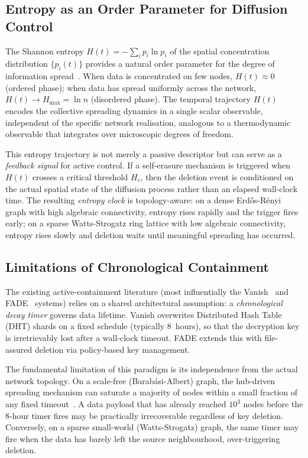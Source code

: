 \documentclass[review,12pt]{elsarticle}
\newcommand{\Hc}{H_c}
\newcommand{\Hmax}{H_{\max}}
\begin{document}
\subsection{Entropy as an Order Parameter for Diffusion Control}

The Shannon entropy $H(t) = -\sum_i p_i \ln p_i$ of the spatial concentration
distribution $\{p_i(t)\}$ provides a natural order parameter for the degree of
information spread~\cite{zhao2024multi}.  When data is concentrated on few nodes,
$H(t) \approx 0$ (ordered phase); when data has spread uniformly across the
network, $H(t) \to \Hmax = \ln n$ (disordered phase).  The temporal trajectory
$H(t)$ encodes the collective spreading dynamics in a single scalar observable,
independent of the specific network realisation, analogous to a
thermodynamic observable that integrates over microscopic degrees of freedom.

This entropy trajectory is not merely a passive descriptor but can serve as a
\emph{feedback signal} for active control.  If a self-erasure mechanism is
triggered when $H(t)$ crosses a critical threshold $\Hc$, then the deletion
event is conditioned on the actual spatial state of the diffusion process
rather than an elapsed wall-clock time.  The resulting \emph{entropy clock}
is topology-aware: on a dense Erd\H{o}s-R\'enyi graph with high algebraic
connectivity, entropy rises rapidly and the trigger fires early; on a sparse
Watts-Strogatz ring lattice with low algebraic connectivity, entropy rises
slowly and deletion waits until meaningful spreading has occurred.

\subsection{Limitations of Chronological Containment}

The existing active-containment literature (most influentially the
Vanish~\cite{geambasu2009vanish} and FADE~\cite{tang2010fade} systems) relies
on a shared architectural assumption: a \emph{chronological decay timer} governs
data lifetime. Vanish overwrites Distributed Hash Table (DHT) shards on a fixed
schedule (typically 8~hours), so that the decryption key is irretrievably lost
after a wall-clock timeout. FADE extends this with file-assured deletion via
policy-based key management.

The fundamental limitation of this paradigm is its independence from the actual
network topology. On a scale-free (Barab\'asi-Albert) graph, the hub-driven
spreading mechanism can saturate a majority of nodes within a small fraction of
any fixed timeout~\cite{barabasi1999emergence,pastor2015epidemic}. A data payload
that has already reached $10^3$ nodes before the 8-hour timer fires may be
practically irrecoverable regardless of key deletion. Conversely, on a
sparse small-world (Watts-Strogatz) graph, the same timer may fire when the
data has barely left the source neighbourhood, over-triggering deletion.
\end{document}
